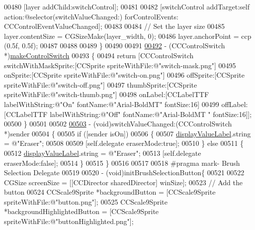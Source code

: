 \begin{DoxyCode}
{{{00480     [layer addChild:switchControl];
00481     
00482     [switchControl addTarget:self action:@selector(switchValueChanged:) forControlEvents:
      CCControlEventValueChanged];
00483     
00484     \textcolor{comment}{// Set the layer size}
00485     layer.contentSize           = CGSizeMake(layer\_width, 0);
00486     layer.anchorPoint           = ccp (0.5f, 0.5f);
00487 
00488     
00489 \}
00490 
00491 
\hypertarget{_controls_layer_8mm_source_l00492}{}\hyperlink{interface_controls_layer_a17c02c66db2aa779b9b7af552eb43a46}{00492} - (CCControlSwitch *)\hyperlink{interface_controls_layer_a17c02c66db2aa779b9b7af552eb43a46}{makeControlSwitch}
00493 \{
00494     \textcolor{keywordflow}{return} [CCControlSwitch switchWithMaskSprite:[CCSprite spriteWithFile:@"switch-mask.png"]
00495                                         onSprite:[CCSprite spriteWithFile:@"switch-on.png"]
00496                                        offSprite:[CCSprite spriteWithFile:@"switch-off.png"]
00497                                      thumbSprite:[CCSprite spriteWithFile:@"switch-thumb.png"]
00498                                          onLabel:[CCLabelTTF labelWithString:@"On" fontName:@"Arial-BoldMT"
       fontSize:16]
00499                                         offLabel:[CCLabelTTF labelWithString:@"Off" fontName:@"Arial-BoldMT
      " fontSize:16]];
00500 \}
00501 
00502 
\hypertarget{_controls_layer_8mm_source_l00503}{}\hyperlink{interface_controls_layer_a02affb06b2d595b54d10b3593a8370f2}{00503} - (void)switchValueChanged:(CCControlSwitch *)sender
00504 \{
00505     \textcolor{keywordflow}{if} ([sender isOn])
00506     \{
00507         \hyperlink{interface_controls_layer_ab9f12f7a90a0bf6ae1abaeb4d4c4e378}{displayValueLabel}.string    = \textcolor{stringliteral}{@"Eraser"};
00508         
00509         [\textcolor{keyword}{self}.delegate eraserMode:true];
00510     \} \textcolor{keywordflow}{else}
00511     \{
00512         \hyperlink{interface_controls_layer_ab9f12f7a90a0bf6ae1abaeb4d4c4e378}{displayValueLabel}.string    = \textcolor{stringliteral}{@"Eraser"};
00513         [\textcolor{keyword}{self}.delegate eraserMode:false];
00514     \}
00515 \}
00516 
00517 
00518 \textcolor{preprocessor}{#pragma mark- Brush Selection Delegate}
00519 \textcolor{preprocessor}{}
00520 - (void)initBrushSelectionButton\{
00521     
00522     CGSize screenSize = [[CCDirector sharedDirector] winSize];
00523     \textcolor{comment}{// Add the button}
00524     CCScale9Sprite *backgroundButton = [CCScale9Sprite spriteWithFile:@"button.png"];
00525     CCScale9Sprite *backgroundHighlightedButton = [CCScale9Sprite spriteWithFile:@"buttonHighlighted.png"];
}}}
\end{DoxyCode}
